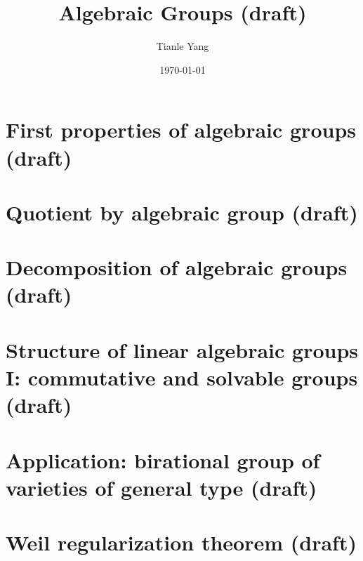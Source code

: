 \documentclass[sectionlevel=chapter]{noteformyself}
\title{Algebraic Groups (draft)}
\author{Tianle Yang}
\date{\today}
\begin{document}
    \maketitle

    \tableofcontents

    \section{First properties of algebraic groups (draft)}
    
    \section{Quotient by algebraic group (draft)}
    
    \section{Decomposition of algebraic groups (draft)}
    
    \section{Structure of linear algebraic groups I: commutative and solvable groups (draft)}
    
    \section{Application: birational group of varieties of general type (draft)}
    
    \section{Weil regularization theorem (draft)}
    

    \printbibliography[heading=bibintoc, title={References}]
    
\end{document}
